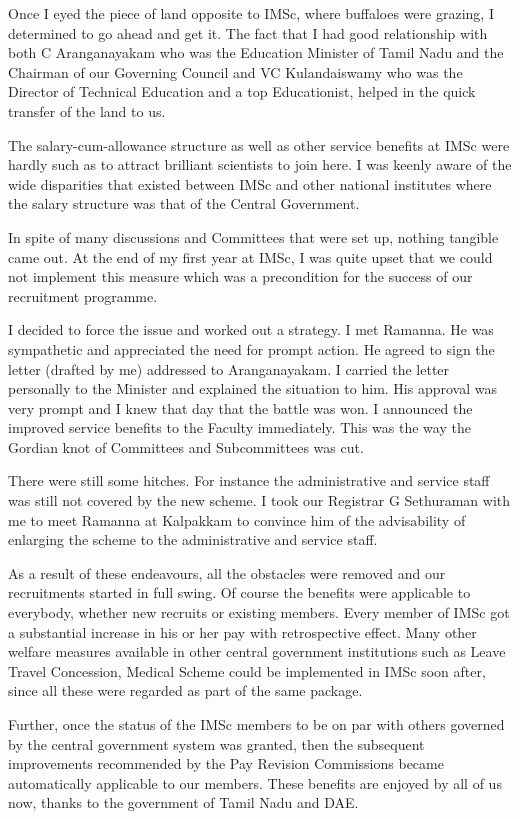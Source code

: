 Once I eyed the piece of land opposite to IMSc, where buffa\-loes were 
grazing, I determined to go ahead and get it. The fact that I had good 
relationship with both C Aranganayakam who was the Education Minister of 
Tamil Nadu and the Chairman of our Governing Council and VC 
Kulandaiswamy who was the Dire\-ctor of Technical Education and a top 
Educationist, helped in the quick transfer of the land to us.

The salary-cum-allowance structure as well as other service benefits at 
IMSc were hardly such as to attract brilliant scientists to join here. I 
was keenly aware of the wide disparities that existed between IMSc and 
other national institutes where the salary structure was that of the 
Central Government.

In spite of many discussions and Committees that were set up, nothing 
tangible came out. At the end of my first year at IMSc, I was quite 
upset that we could not implement this measure which was a precondition 
for the success of our recruitment programme.

I decided to force the issue and worked out a strategy. I met Ramanna. 
He was sympathetic and appreciated the need for prompt action. He agreed 
to sign the letter (drafted by me) addressed to Aranganayakam. I carried 
the letter personally to the Minister and explained the situation to 
him. His approval was very prompt and I knew that day that the battle 
was won. I announced the improved service benefits to the Faculty 
immediately. This was the way the Gordian knot of Committees and 
Subcommittees was cut.

There were still some hitches. For instance the administrative and 
service staff was still not covered by the new scheme. I took our 
Registrar G Sethuraman with me to meet Ramanna at Kalpakkam to convince 
him of the advisability of enlarging the scheme to the administrative 
and service staff.

As a result of these endeavours, all the obstacles were removed and our 
recruitments started in full swing. Of course the benefits were 
applicable to everybody, whether new recruits or existing members. Every 
member of IMSc got a substantial increase in his or her pay with 
retrospective effect. Many other welfare measures available in other 
central government institutions such as Leave Travel Concession, Medical 
Scheme could be implemented in IMSc soon after, since all these were 
regarded as part of the same package.

Further, once the status of the IMSc members to be on par with others 
governed by the central government system was granted, then the 
subsequent improvements recommended by the Pay Revision Commissions 
became automatically applicable to our members. These benefits are 
enjoyed by all of us now, thanks to the government of Tamil Nadu and 
DAE.


